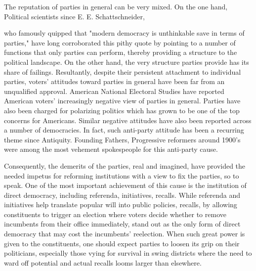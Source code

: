 \documentclass[crop=false]{standalone}
\begin{document}
	The reputation of parties in general can be very mixed. 
	On the one hand, 
	Political scientists since E. E. Schattschneider, 
	\autocite*[1]{schattschneiderPartyGovernmentAmerican2017}
	
	who famously quipped that
	"modern democracy is unthinkable save in terms of parties," have long corroborated this pithy quote by pointing to
	a number of functions that only parties can perform, thereby providing a structure to the political landscape.
	On the other hand, the very structure parties provide has its share of failings.
	Resultantly, despite their persistent attachment to individual parties, voters' attitudes toward parties in general have been far from an unqualified approval.
	American National Electoral Studies 
	have reported American voters' increasingly negative view of parties in general.
	Parties have also been charged for polarizing politics which has grown to be one of the top concerns for Americans.
	Similar negative attitudes have also been reported across a number of democracies.
	In fact, such anti-party attitude has been a recurring theme since Antiquity.
	Founding Fathers, Progressive reformers around 1900's were among the most vehement spokespeople 
	for this anti-party cause. 
	
	Consequently, the demerits of the parties, real and imagined, have provided the needed impetus for reforming institutions with a view to fix the parties, so to speak.
	One of the most important achievement of this cause is the institution of direct democracy, including referenda, initiatives, recalls. 
	While referenda and initiatives help translate popular will into public policies, recalls,
	by allowing constituents to trigger an election where voters decide whether to remove incumbents from their office immediately, 
	stand out as the only form of direct democracy that may cost the incumbents' reelection.
	When such great power is given to the constituents, one should expect parties to loosen its grip on their politicians, 
	especially those vying for survival in swing districts where the need to ward off potential and actual recalls looms larger than elsewhere. 
	
\end{document}
